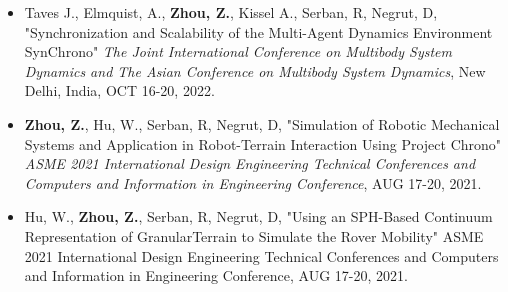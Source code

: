 



\begin{footnotesize}

\begin{itemize}[leftmargin=2ex, nosep, noitemsep]
	
	\item {Taves J., Elmquist, A., \textbf{Zhou, Z.}, Kissel A., Serban, R, Negrut, D, "Synchronization and Scalability of the Multi-Agent Dynamics Environment SynChrono" \textit {The Joint International Conference on Multibody System Dynamics and The Asian Conference on Multibody System Dynamics}, New Delhi, India, OCT 16-20, 2022.}
	
	
	
	\item {\textbf{Zhou, Z.}, Hu, W., Serban, R, Negrut, D, "Simulation of Robotic Mechanical Systems and Application in Robot-Terrain Interaction Using Project Chrono" \textit {ASME 2021 International Design Engineering Technical Conferences and Computers and Information in Engineering Conference}, AUG 17-20, 2021.}
	

	
	\item {Hu, W., \textbf{Zhou, Z.}, Serban, R, Negrut, D, "Using an SPH-Based Continuum Representation of GranularTerrain to Simulate the Rover Mobility" {ASME 2021 International Design Engineering Technical Conferences and Computers and Information in Engineering Conference}, AUG 17-20, 2021.}
	

\end{itemize}
	
\end{footnotesize}


